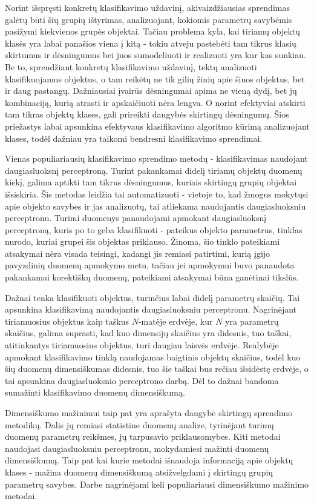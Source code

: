\documentclass{VUMIFPSbakalaurinis}
\begin{document}
Norint išspręsti konkretų klasifikavimo uždavinį, akivaizdžiausias sprendimas galėtų būti šių grupių ištyrimas, analizuojant, kokiomis parametrų savybėmis pasižymi kiekvienos grupės objektai.
Tačiau problema kyla, kai tiriamų objektų klasės yra labai panašios viena į kitą - tokiu atveju pastebėti tam tikrus klasių skirtumus ir dėsningumus bei juos sumodeliuoti ir realizuoti yra kur kas sunkiau.
Be to, sprendžiant konkretų klasifikavimo uždavinį, tektų analizuoti klasifikuojamus objektus, o tam reikėtų ne tik gilių žinių apie šiuos objektus, bet ir daug pastangų.
Dažniausiai įvairūs dėsningumai apima ne vieną dydį, bet jų kombinaciją, kurią atrasti ir apskaičiuoti nėra lengva.
O norint efektyviai atskirti tam tikras objektų klases, gali prireikti daugybės skirtingų dėsningumų.
Šios priežastys labai apsunkina efektyvaus klasifikavimo algoritmo kūrimą analizuojant klases, todėl dažniau yra taikomi bendresni klasifikavimo sprendimai.

Vienas populiariausių klasifikavimo sprendimo metodų - klasifikavimas naudojant daugiasluoksnį perceptroną.
Turint pakankamai didelį tiriamų objektų duomenų kiekį, galima aptikti tam tikrus dėsningumus, kuriais skirtingų grupių objektai išsiskiria.
Šis metodas leidžia tai automatizuoti - vietoje to, kad žmogus mokytųsi apie objekto savybes ir jas analizuotų, tai atliekama naudojantis daugiasluoksniu perceptronu.
Turimi duomenys panaudojami apmokant daugiasluoksnį perceptroną, kuris po to geba klasifikuoti - pateikus objekto parametrus, tinklas nurodo, kuriai grupei šis objektas priklauso.
Žinoma, šio tinklo pateikiami atsakymai nėra visada teisingi, kadangi jis remiasi patirtimi, kurią įgijo pavyzdinių duomenų apmokymo metu, tačiau jei apmokymui buvo panaudota pakankamai korektiškų duomenų, pateikiami atsakymai būna ganėtinai tikslūs.

Dažnai tenka klasifikuoti objektus, turinčius labai didelį parametrų skaičių.
Tai apsunkina klasifikavimą naudojantis daugiasluoksniu perceptronu.
Nagrinėjant tiriamuosius objektus kaip taškus $N$-matėje erdvėje, kur $N$ yra parametrų skaičius, galima suprasti, kad kuo dimensijų skaičius yra didesnis, tuo taškai, atitinkantys tiriamuosius objektus, turi daugiau laisvės erdvėje.
Realybėje apmokant klasifikavimo tinklą naudojamas baigtinis objektų skaičius, todėl kuo šių duomenų dimensiškumas didesnis, tuo šie taškai bus rečiau išsidėstę erdvėje, o tai apsunkina daugiasluoksnio perceptrono darbą.
Dėl to dažnai bandoma sumažinti klasifikavimo duomenų dimensiškumą.

Dimensiškumo mažinimui taip pat yra aprašyta daugybė skirtingų sprendimo metodikų.
Dalis jų remiasi statistine duomenų analize, tyrinėjant turimų duomenų parametrų reikšmes, jų tarpusavio priklausomybes.
Kiti metodai naudojasi daugiasluoksniu perceptronu, mokydamiesi mažinti duomenų dimensiškumą.
Taip pat kai kurie metodai išnaudoja informaciją apie objektų klases - mažina duomenų dimensiškumą atsižvelgdami į skirtingų grupių parametrų savybes.
Darbe nagrinėjami keli populiariausi dimensiškumo mažinimo metodai.
\end{document}
